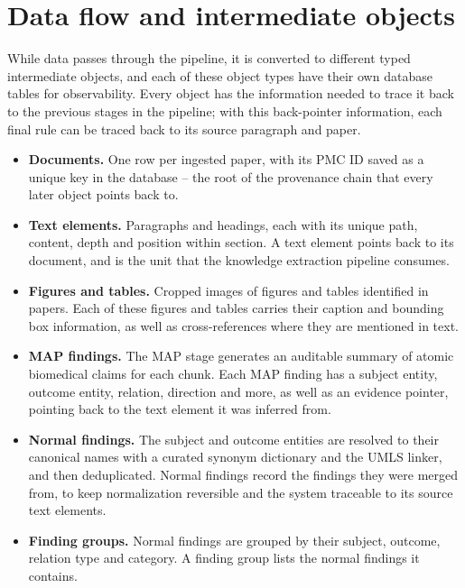 \section{Data flow and intermediate objects}

While data passes through the pipeline, it is converted to different typed intermediate objects, and each of these object types have their own database tables for observability. Every object has the information needed to trace it back to the previous stages in the pipeline; with this back-pointer information, each final rule can be traced back to its source paragraph and paper.

\begin{itemize}[label={}, leftmargin=1.5em, itemsep=0.4em]
    \item \textbf{Documents.} One row per ingested paper, with its PMC ID saved as a unique key in the database -- the root of the provenance chain that every later object points back to.

    \item \textbf{Text elements.} Paragraphs and headings, each with its unique path, content, depth and position within section. A text element points back to its document, and is the unit that the knowledge extraction pipeline consumes.
    
    \item \textbf{Figures and tables.} Cropped images of figures and tables identified in papers. Each of these figures and tables carries their caption and bounding box information, as well as cross-references where they are mentioned in text.

    \item \textbf{MAP findings.} The MAP stage generates an auditable summary of atomic biomedical claims for each chunk. Each MAP finding has a subject entity, outcome entity, relation, direction and more, as well as an evidence pointer, pointing back to the text element it was inferred from.

    \item \textbf{Normal findings.} The subject and outcome entities are resolved to their canonical names with a curated synonym dictionary and the UMLS linker, and then deduplicated. Normal findings record the findings they were merged from, to keep normalization reversible and the system traceable to its source text elements. 

    \item \textbf{Finding groups.} Normal findings are grouped by their subject, outcome, relation type and category. A finding group lists the normal findings it contains.


\end{itemize}

